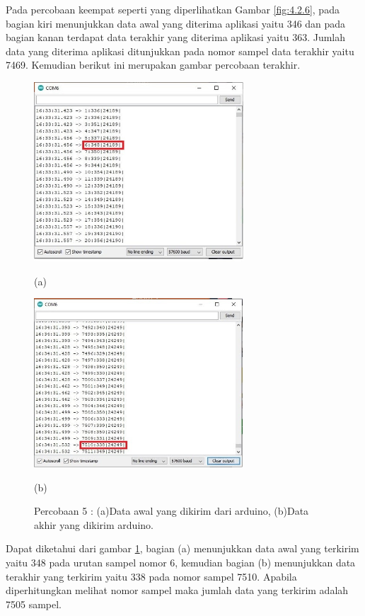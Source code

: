 \vspace{1ex}
Pada percobaan keempat seperti yang diperlihatkan Gambar \ref{fig:4.2.6}, pada bagian kiri menunjukkan data awal yang diterima aplikasi yaitu 346 dan pada bagian kanan terdapat data terakhir yang diterima aplikasi yaitu 363. Jumlah data yang diterima aplikasi ditunjukkan pada nomor sampel data terakhir yaitu 7469. Kemudian berikut ini merupakan gambar percobaan terakhir.
\begin{figure}[H] \centering
	\includegraphics[width=0.7\textwidth]{img/percob/Slide9}
	
	(a)
	
	\includegraphics[width=0.7\textwidth]{img/percob/Slide10}
	
	(b)
	
	\caption{Percobaan 5 : (a)Data awal yang dikirim dari arduino, (b)Data akhir yang dikirim arduino.}
	\label{fig:4.2.7}
\end{figure}
\vspace{1ex}
Dapat diketahui dari gambar \ref{fig:4.2.7}, bagian (a) menunjukkan data awal yang terkirim yaitu 348 pada urutan sampel nomor 6, kemudian bagian (b) menunjukkan data terakhir yang terkirim yaitu 338 pada nomor sampel 7510. Apabila diperhitungkan melihat nomor sampel maka jumlah data yang terkirim adalah 7505 sampel.
